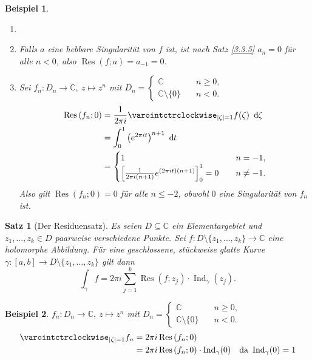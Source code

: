 \documentclass[a4paper,12pt]{article}
\theoremstyle{newthm}
\newtheorem{thm}{Satz}[subsection]
\theoremstyle{newdef}
\theoremstyle{newrem}
\newtheorem*{exmp*}{Beispiel}
\newcommand{\C}{\mathbb{C}}
\renewcommand{\d}{\ \operatorname{d}\hspace{-2px}}
\newcommand{\Ind}[1]{\operatorname{Ind}_{#1}}
\newcommand{\Res}[2]{\operatorname{Res} \left( #1;#2 \right) }
\begin{document}
		\begin{exmp*}
			\begin{enumerate}[label={\alph*})]
				\item[]
				\item Falls $a$ eine hebbare Singularität von $f$ ist, ist nach Satz \ref{3.3.5} $a_n = 0$ für alle $n < 0$, also $\Res{f}{a} = a_{-1} = 0$.
				\item Sei $ f_n : D_n \to \C,\ z \mapsto z^n $ mit $ D_n = \begin{cases}
				\C \quad &n \geq 0,\\
				\C \setminus\{0\} \quad &n<0.
				\end{cases} $
				\begin{align*}
					\Res{f_n}{0} &= \frac{1}{2\pi i} \varointctrclockwise_{|\zeta| = 1} f(\zeta)\d\zeta\\
					&= \int_0^1 \left(e^{2\pi it}\right)^{n+1}\d t\\
					&= \begin{cases}
					1 \quad &n = -1,\\
					\left[ \frac{1}{2\pi i(n+1)} e^{(2\pi it)(n+1)} \right]_0^1 = 0 \quad &n \neq -1.
					\end{cases}
				\end{align*}
				Also gilt $ \Res{f_n}{0} = 0 $ für alle $n \leq -2$, obwohl $0$ eine Singularität von $f_n$ ist.
			\end{enumerate}
		\end{exmp*}
		
		\begin{thm}[Der Residuensatz]\label{3.4.4}
			Es seien $ D \subseteq \C $ ein Elementargebiet und $z_1,\dotsc,z_k \in D$ paarweise verschiedene Punkte. Sei $ f: D \setminus\{z_1,\dotsc,z_k\} \to \C $ eine holomorphe Abbildung. Für eine geschlossene, stückweise glatte Kurve $\gamma: [a,b] \to D \setminus\{z_1,\dotsc,z_k\}$ gilt dann
			\[ \int_\gamma f = 2\pi i \sum_{j=1}^k \Res{f}{z_j} \cdot \Ind{\gamma}(z_j). \]
		\end{thm}
		
		\begin{exmp*}
			$ f_n : D_n \to \C,\ z \mapsto z^n $ mit $ D_n = \begin{cases}
			\C \quad &n \geq 0,\\
			\C \setminus\{0\} \quad &n<0.
			\end{cases} $
			\begin{align*}
				\varointctrclockwise_{|\zeta| = 1} f_n &= 2\pi i \Res{f_n}{0}\\
				&= 2\pi i \Res{f_n}{0} \cdot \Ind{\gamma}(0) \quad \text{da } \Ind{\gamma}(0)=1
			\end{align*}
		\end{exmp*}
		
\end{document}

